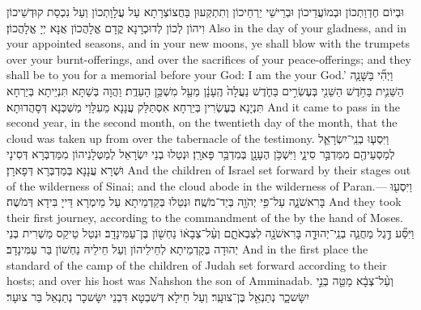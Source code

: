 {וּבְיוֹם חֶדְוַתְכוֹן וּבְמוֹעֲדֵיכוֹן וּבְרֵישֵׁי יַרְחֵיכוֹן וְתִתְקְעוּן בַּחֲצוֹצְרָתָא עַל עֲלָוָתְכוֹן וְעַל נִכְסַת קוּדְשֵׁיכוֹן וִיהוֹן לְכוֹן לְדוּכְרָנָא קֳדָם אֱלָהֲכוֹן אֲנָא יְיָ אֱלָהֲכוֹן׃}
{Also in the day of your gladness, and in your appointed seasons, and in your new moons, ye shall blow with the trumpets over your burnt-offerings, and over the sacrifices of your peace-offerings; and they shall be to you for a memorial before your God: I am the \lord\space your God.’}{}
{וַיְהִ֞י בַּשָּׁנָ֧ה הַשֵּׁנִ֛ית בַּחֹ֥דֶשׁ הַשֵּׁנִ֖י בְּעֶשְׂרִ֣ים בַּחֹ֑דֶשׁ נַעֲלָה֙ הֶֽעָנָ֔ן מֵעַ֖ל מִשְׁכַּ֥ן הָעֵדֻֽת׃
}
{וַהֲוָה בְּשַׁתָּא תִּנְיֵיתָא בְּיַרְחָא תִּנְיָנָא בְּעֶשְׂרִין בְּיַרְחָא אִסְתַּלַּק עֲנָנָא מֵעִלָּוֵי מַשְׁכְּנָא דְּסָהֲדוּתָא׃}
{And it came to pass in the second year, in the second month, on the twentieth day of the month, that the cloud was taken up from over the tabernacle of the testimony.}{}
{וַיִּסְע֧וּ בְנֵֽי־יִשְׂרָאֵ֛ל לְמַסְעֵיהֶ֖ם מִמִּדְבַּ֣ר סִינָ֑י וַיִּשְׁכֹּ֥ן הֶעָנָ֖ן בְּמִדְבַּ֥ר פָּארָֽן׃
}
{וּנְטַלוּ בְנֵי יִשְׂרָאֵל לְמַטְּלָנֵיהוֹן מִמַּדְבְּרָא דְּסִינָי וּשְׁרָא עֲנָנָא בְּמַדְבְּרָא דְּפָארָן׃}
{And the children of Israel set forward by their stages out of the wilderness of Sinai; and the cloud abode in the wilderness of Paran.—}{}
{וַיִּסְע֖וּ בָּרִאשֹׁנָ֑ה עַל־פִּ֥י יְהֹוָ֖ה בְּיַד־מֹשֶֽׁה׃}
{וּנְטַלוּ בְּקַדְמֵיתָא עַל מֵימְרָא דַּייָ בִּידָא דְּמֹשֶׁה׃}
{And they took their first journey, according to the commandment of the \lord\space by the hand of Moses.}{}
{וַיִּסַּ֞ע דֶּ֣גֶל מַחֲנֵ֧ה בְנֵֽי־יְהוּדָ֛ה בָּרִאשֹׁנָ֖ה לְצִבְאֹתָ֑ם וְעַ֨ל־צְבָא֔וֹ נַחְשׁ֖וֹן בֶּן־עַמִּינָדָֽב׃}
{וּנְטַל טֵיקַס מַשְׁרִית בְּנֵי יְהוּדָה בְּקַדְמֵיתָא לְחֵילֵיהוֹן וְעַל חֵילֵיהּ נַחְשׁוֹן בַּר עַמִּינָדָב׃}
{And in the first place the standard of the camp of the children of Judah set forward according to their hosts; and over his host was Nahshon the son of Amminadab.}{}
{וְעַ֨ל־צְבָ֔א מַטֵּ֖ה בְּנֵ֣י יִשָּׂשכָ֑ר נְתַנְאֵ֖ל בֶּן־צוּעָֽר׃}
{וְעַל חֵילָא דְּשִׁבְטָא דִּבְנֵי יִשָּׂשכָר נְתַנְאֵל בַּר צוּעָר׃}
